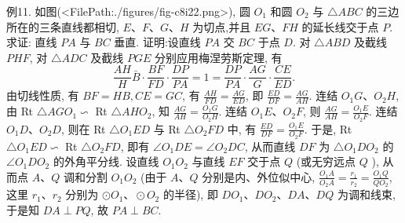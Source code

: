 例11. 如图(<FilePath:./figures/fig-c8i22.png>), 圆 $O_1$ 和圆 $O_2$ 与 $\triangle A B C$ 的三边所在的三条直线都相切, $E 、 F 、 G 、 H$ 为切点,并且 $E G 、 F H$ 的延长线交于点 $P$. 求证: 直线 $P A$ 与 $B C$ 垂直.
证明:设直线 $P A$ 交 $B C$ 于点 $D$.
对 $\triangle A B D$ 及截线 $P H F$, 对 $\triangle A D C$ 及截线 $P G E$ 分别应用梅涅劳斯定理, 有
$$
\frac{A H}{H} \bar{B} \cdot \frac{B F}{F D} \cdot \frac{D P}{P A}=1=\frac{D P}{P A} \cdot \frac{A G}{G} \cdot \frac{C E}{E D} .
$$
由切线性质, 有 $B F=H B, C E=G C$, 有 $\frac{A H}{F D}=\frac{A G}{E D}$, 即 $\frac{E D}{D F}=\frac{A G}{A H}$. 连结 $O_1 G 、 O_2 H$, 由 Rt $\triangle A G O_1 \backsim$ Rt $\triangle A H O_2$, 知 $\frac{A G}{A H}=\frac{O_1 G}{O_2 H}$.
连结 $O_1 E 、 O_2 F$, 则 $\frac{A G}{A H}=\frac{O_1 E}{O_2 F}$.
连结 $O_1 D 、 O_2 D$, 则在 Rt $\triangle O_1 E D$ 与 Rt $\triangle O_2 F D$ 中, 有 $\frac{E D}{D F}=\frac{O_1 E}{O_2 F}$.
于是, Rt $\triangle O_1 E D \backsim$ Rt $\triangle O_2 F D$, 即有 $\angle O_1 D E=\angle O_2 D C$, 从而直线 $D F$ 为 $\triangle O_1 D O_2$ 的 $\angle O_1 D O_2$ 的外角平分线.
设直线 $O_1 O_2$ 与直线 $E F$ 交于点 $Q$ (或无穷远点 $Q$ ), 从而点 $A 、 Q$ 调和分割 $O_1 O_2$ (由于 $A 、 Q$ 分别是内、外位似中心, $\frac{O_1 A}{O_2 A}=\frac{r_1}{r_2}=\frac{O_1 Q}{Q O_2}$, 这里 $r_1 、 r_2$ 分别为 $\odot O_1 、 \odot O_2$ 的半径), 即 $D O_1 、 D O_2 、 D A 、 D Q$ 为调和线束, 于是知 $D A \perp P Q$, 故 $P A \perp B C$.


